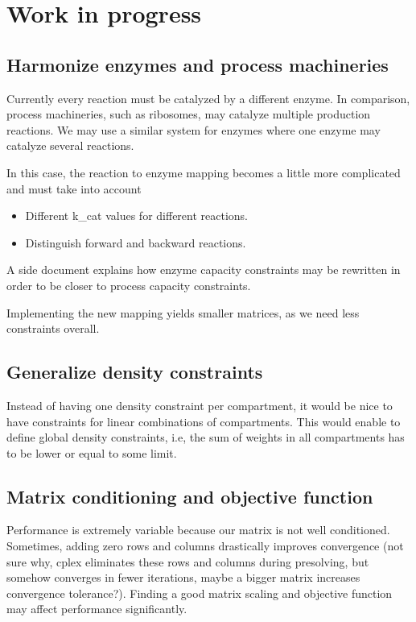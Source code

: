 
\section{Work in progress}

\subsection{Harmonize enzymes and process machineries}

Currently every reaction must be catalyzed by a different enzyme.
In comparison, process machineries, such as ribosomes, may catalyze multiple
production reactions.
We may use a similar system for enzymes where one enzyme may catalyze several
reactions.

In this case, the reaction to enzyme mapping becomes a little more complicated
and must take into account
\begin{itemize}
  \item Different k\_cat values for different reactions.
  \item Distinguish forward and backward reactions.
\end{itemize}
A side document explains how enzyme capacity constraints may be rewritten
in order to be closer to process capacity constraints.

Implementing the new mapping yields smaller matrices, as we need less
constraints overall.

\subsection{Generalize density constraints}

Instead of having one density constraint per compartment,
it would be nice to have constraints for linear combinations of compartments.
This would enable to define global density constraints, i.e,
the sum of weights in all compartments has to be lower or equal to some limit.

\subsection{Matrix conditioning and objective function}

Performance is extremely variable because our matrix is not well conditioned.
Sometimes, adding zero rows and columns drastically improves convergence
(not sure why, cplex eliminates these rows and columns during presolving, but
somehow converges in fewer iterations, maybe a bigger matrix increases
convergence tolerance?).
Finding a good matrix scaling and objective function may affect performance
significantly.
